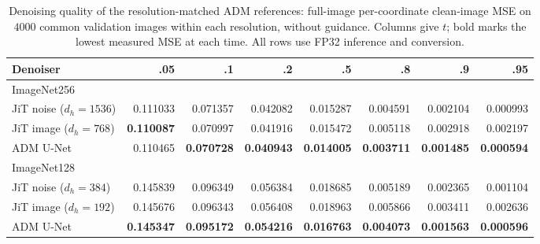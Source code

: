 \begin{table}[H]
\centering
\caption{Denoising quality of the resolution-matched ADM references: full-image per-coordinate clean-image MSE on $4000$ common validation images within each resolution, without guidance. Columns give $t$; bold marks the lowest measured MSE at each time. All rows use FP32 inference and conversion.}
\label{tab:adm-denoising-quality}
\small
\setlength{\tabcolsep}{3pt}
\begin{tabular}{lrrrrrrr}
\toprule
Denoiser & .05 & .1 & .2 & .5 & .8 & .9 & .95\\
\midrule
\multicolumn{8}{l}{ImageNet256}\\
JiT noise ($d_h=1536$) & 0.111033 & 0.071357 & 0.042082 & 0.015287 & 0.004591 & 0.002104 & 0.000993\\
JiT image ($d_h=768$) & \textbf{0.110087} & 0.070997 & 0.041916 & 0.015472 & 0.005118 & 0.002918 & 0.002197\\
ADM U-Net & 0.110465 & \textbf{0.070728} & \textbf{0.040943} & \textbf{0.014005} & \textbf{0.003711} & \textbf{0.001485} & \textbf{0.000594}\\
\midrule
\multicolumn{8}{l}{ImageNet128}\\
JiT noise ($d_h=384$) & 0.145839 & 0.096349 & 0.056384 & 0.018685 & 0.005189 & 0.002365 & 0.001104\\
JiT image ($d_h=192$) & 0.145676 & 0.096343 & 0.056408 & 0.018963 & 0.005866 & 0.003411 & 0.002636\\
ADM U-Net & \textbf{0.145347} & \textbf{0.095172} & \textbf{0.054216} & \textbf{0.016763} & \textbf{0.004073} & \textbf{0.001563} & \textbf{0.000596}\\
\bottomrule
\end{tabular}
\end{table}
